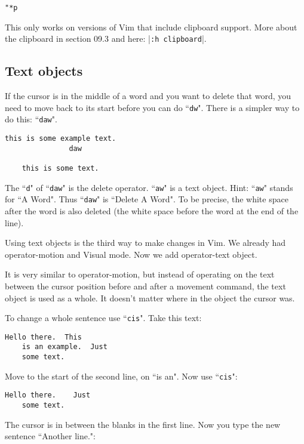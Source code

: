  \begin{Verbatim}[samepage=true]
 "*p
 \end{Verbatim}

This only works on versions of Vim that include clipboard support.
More about the clipboard in section 09.3 and here: |\texttt{:h clipboard}|.

\subsection{Text objects}

If the cursor is in the middle of a word and you want to delete that word, you need to move back to its start before you can do ``\texttt{dw}".
There is a simpler way to do this: ``\texttt{daw}".

\begin{Verbatim}[samepage=true]
    this is some example text.
               daw

    this is some text.
\end{Verbatim}

The ``\texttt{d}" of ``\texttt{daw}" is the delete operator.
``\texttt{aw}" is a text object.
Hint: ``\texttt{aw}" stands for ``A Word".
Thus ``\texttt{daw}" is ``Delete A Word".
To be precise, the white space after the word is also deleted (the white space before the word at the end of the line).

Using text objects is the third way to make changes in Vim.
We already had operator-motion and Visual mode.
Now we add operator-text object.

It is very similar to operator-motion, but instead of operating on the text between the cursor position before and after a movement command, the text object is used as a whole.
It doesn't matter where in the object the cursor was.

To change a whole sentence use ``\texttt{cis}".
Take this text:

\begin{Verbatim}[samepage=true]
    Hello there.  This
    is an example.  Just
    some text.
\end{Verbatim}

Move to the start of the second line, on ``is an".
Now use ``\texttt{cis}":

\begin{Verbatim}[samepage=true]
    Hello there.    Just
    some text.
\end{Verbatim}

The cursor is in between the blanks in the first line.
Now you type the new sentence ``Another line.":

